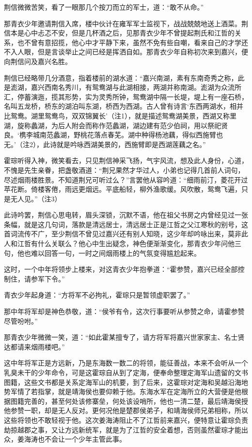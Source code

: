 荆信微微苦笑，看了一眼那几个按刀而立的军士，道：“敢不从命。”

那青衣少年邀请荆信入席，楼中伙计在雍军军士监视下，战战兢兢地送上酒菜。荆信本是心中忐忑不安，但是几杯酒之后，见那青衣少年不曾提起荆氏和江哲的关系，也不曾有意招揽，他心中才平静下来，虽然不免有些自嘲，看来自己的才学还不入人眼，但是言谈举止之间已经是挥洒自如。那青衣少年自称初次来到嘉兴，便向荆信问及嘉兴名胜。

荆信已经略带几分酒意，指着楼前的湖水道：“嘉兴南湖，素有东南奇秀之称，此是滮湖，嘉兴西南名秀川，有鸳鸯湖与此湖相接，两湖并称南湖。滮湖为众流所汇，停蓄演迤，揽其形势，实为灵秀所钟，鸳鸯湖中隔一长堤，堤上有一座石桥，名叫五龙桥，桥东的湖泊叫东湖，桥西为西湖。古人曾有诗言‘东西两湖水，相并比鸳鸯。湖里鸳鸯鸟，双双锦翼长’（注1），就是描述鸳鸯湖美景，西湖又称里湖，旋称蠡湖，为后人附会而称作范蠡湖，湖边建有范少伯祠，用以祭祀贤良。‘槜李城南范蠡湖，野桃花落点春芜。湖中种得杨池藕，得似西施臂也无。’（注2），此诗就是吟咏西湖美景的，西施臂即是西湖莲藕之名。”

霍琮听得入神，微笑看去，只见荆信神采飞扬，气宇风流，想及此人身份，心道，不愧是先生亲眷，把盏敬酒道：“荆兄果然才华过人，小弟也记得几首前人词句，尽述烟雨楼胜景。不知道荆兄可听过么？”言罢他从容吟道：“细雨前汀，菱花开过苹花断。倚楼客倦，雨远更烟远。平底船轻，柳外渔歌缓。风吹散，鸳鸯飞遍，只是无人见。”（注3）

此诗吟罢，荆信心思电转，眉头深锁，沉默不语，他在祖父书房之内曾经见过一张条幅，就是这几句词，落款是清远居士，清远居士正是江哲之父江寒秋的别号，这首词流传不广，至少荆信不曾见过嘉兴还有别人知晓，这少年却吟咏出来，莫非此人和江哲有什么关联么？他心中生出疑念，神色便渐渐变化，那青衣少年问他三句，他也难以回答一句，一时之间烟雨楼上的气氛变得尴尬起来。

这时，一个中年将领步上楼来，对这青衣少年抱拳道：“霍参赞，嘉兴已经全部控制住，请参军下令。”

青衣少年起身道：“方将军不必拘礼，霍琮只是暂领虚职罢了。”

那中年将军却是神色恭敬，道：“侯爷有令，这次行事要听从参赞之命，请霍参赞尽管吩咐。”

那青衣少年微微一笑，道：“如此霍某擅专了，请方将军将嘉兴世家家主、名士贤达都请来烟雨楼吧。”

这中年将军正是方远新，乃是东海数一数二的将领，能征善战，本来不会听从一个乳臭未干的少年命令，可是这霍琮自从到了定海，便奉命整理定海军山遗留的文书图籍，这些文书都是关系定海军山的机要，到了后来，这霍琮对定海和吴越沿海地势军情了若指掌，就是靖海侯也要仰赖于他。东海水军在定海所立的大营便是他根据图籍完善的，甚至何处该修寨垒，何处该设哨所，他也一清二楚，最后靖海侯授他参赞一职，却是无人反对。更何况他是楚郡侯弟子，和靖海侯师兄弟相称，所以这些将领也不敢轻视于他。这次姜海涛阻止不了江哲前来嘉兴，便特意让霍琮负责劫掠越郡之事，又让方远新统军，就是为了江哲的安全着想，否则虽然霍琮才能出众，姜海涛也不会让一个少年主管此事。

